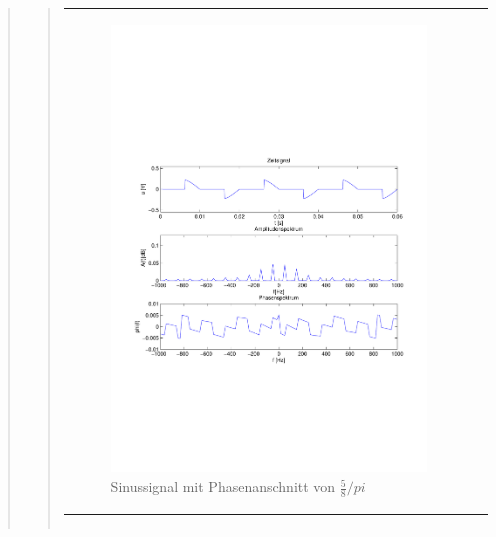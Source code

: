 \begin{quote}
\begin{quote}
\begin{center}
\begin{tabular}{ll}
\begin{minipage}{0.6\textwidth}
                   \begin{figure}[H]
                        \label{fig:}
                        \includegraphics[scale=0.5, trim = 2cm 7cm 1.5cm 8.5cm, clip]{./Bilder/Phasenanschnitt58pi.pdf} %
                        \caption{Sinussignal mit Phasenanschnitt von $\frac{5}{8}/pi$}
                    \end{figure}
                 \vspace{-1.5em}

                \end{minipage}

            \end{tabular}
            \end{center}

            \begin{center}
            \begin{tabular}{ll}


\end{tabular}
\end{center}
\end{quote}
\end{quote}
